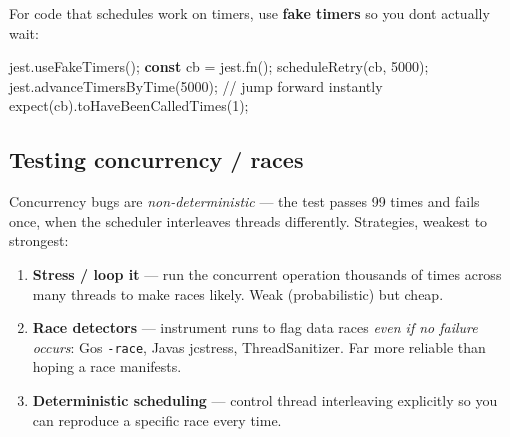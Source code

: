 \documentclass[11pt]{article}
\providecommand{\tightlist}{\setlength{\itemsep}{1pt}\setlength{\parskip}{0pt}}
\newenvironment{Shaded}{\begin{snugshade}}{\end{snugshade}}
\newcommand{\CommentTok}[1]{\textcolor[rgb]{0.48,0.49,0.49}{#1}}
\newcommand{\DecValTok}[1]{\textcolor[rgb]{0.96,0.45,0.00}{#1}}
\newcommand{\FunctionTok}[1]{\textcolor[rgb]{0.56,0.27,0.68}{#1}}
\newcommand{\KeywordTok}[1]{\textcolor[rgb]{0.81,0.81,0.76}{\textbf{#1}}}
\newcommand{\NormalTok}[1]{\textcolor[rgb]{0.81,0.81,0.76}{#1}}
\newcommand{\OperatorTok}[1]{\textcolor[rgb]{0.81,0.81,0.76}{#1}}
\begin{document}
For code that schedules work on timers, use \textbf{fake timers} so you don\textquotesingle t actually wait:


\begin{Shaded}
\begin{Highlighting}[]
\NormalTok{jest}\OperatorTok{.}\FunctionTok{useFakeTimers}\NormalTok{()}\OperatorTok{;}
\KeywordTok{const}\NormalTok{ cb }\OperatorTok{=}\NormalTok{ jest}\OperatorTok{.}\FunctionTok{fn}\NormalTok{()}\OperatorTok{;}
\FunctionTok{scheduleRetry}\NormalTok{(cb}\OperatorTok{,} \DecValTok{5000}\NormalTok{)}\OperatorTok{;}
\NormalTok{jest}\OperatorTok{.}\FunctionTok{advanceTimersByTime}\NormalTok{(}\DecValTok{5000}\NormalTok{)}\OperatorTok{;}   \CommentTok{// jump forward instantly}
\FunctionTok{expect}\NormalTok{(cb)}\OperatorTok{.}\FunctionTok{toHaveBeenCalledTimes}\NormalTok{(}\DecValTok{1}\NormalTok{)}\OperatorTok{;}
\end{Highlighting}
\end{Shaded}

\subsection{Testing concurrency / races}\label{testing-concurrency--races}

Concurrency bugs are \emph{non-deterministic} --- the test passes 99 times and fails once, when the scheduler interleaves threads differently. Strategies, weakest to strongest:

\begin{enumerate}
\def\labelenumi{\arabic{enumi}.}
\tightlist
\item
  \textbf{Stress / loop it} --- run the concurrent operation thousands of times across many threads to make races likely. Weak (probabilistic) but cheap.
\item
  \textbf{Race detectors} --- instrument runs to flag data races \emph{even if no failure occurs}: Go\textquotesingle s \texttt{-race}, Java\textquotesingle s jcstress, ThreadSanitizer. Far more reliable than hoping a race manifests.
\item
  \textbf{Deterministic scheduling} --- control thread interleaving explicitly so you can reproduce a specific race every time.
\end{enumerate}

\end{document}
